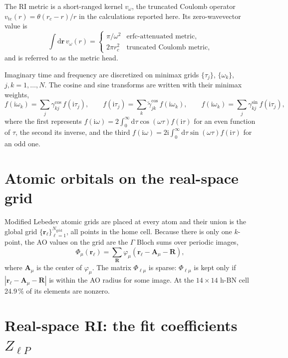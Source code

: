 \documentclass[11pt,a4paper]{article}
\newcommand{\br}{\mathbf{r}}
\newcommand{\bR}{\mathbf{R}}
\newcommand{\dd}{\mathrm{d}}
\newcommand{\ii}{\mathrm{i}}
\newcommand{\tc}{\mathrm{tc}}
\begin{document}
The RI metric is a short-ranged kernel $v_\omega$, the truncated Coulomb operator
$v_\tc(r) = \theta(r_c-r)/r$ in the calculations reported here. Its zero-wavevector value is
\begin{equation}
  \int\dd\br\, v_\omega(r) =
  \begin{cases}
    \pi/\omega^2 & \text{erfc-attenuated metric},\\
    2\pi r_c^2 & \text{truncated Coulomb metric},
  \end{cases}
  \label{eq:metric_head}
\end{equation}
and is referred to as the metric head.

Imaginary time and frequency are discretized on minimax grids $\{\tau_j\}$, $\{\omega_k\}$,
$j,k = 1,\dots,N$. The cosine and sine transforms are written with their minimax weights,
\begin{equation}
  f(\ii\omega_k) = \sum_j \gamma^{\cos}_{kj}\, f(\ii\tau_j),\qquad
  f(\ii\tau_j) = \sum_k \tilde\gamma^{\cos}_{jk}\, f(\ii\omega_k),\qquad
  f(\ii\omega_k) = \sum_j \gamma^{\sin}_{kj}\, f(\ii\tau_j),
  \label{eq:transforms}
\end{equation}
where the first represents $f(\ii\omega) = 2\int_0^\infty\dd\tau\cos(\omega\tau)f(\ii\tau)$ for
an even function of $\tau$, the second its inverse, and the third
$f(\ii\omega) = 2\ii\int_0^\infty\dd\tau\sin(\omega\tau)f(\ii\tau)$ for an odd one.

\section{Atomic orbitals on the real-space grid}

Modified Lebedev atomic grids are placed at every atom and their union is the global grid
$\{\br_\ell\}_{\ell=1}^{N_\mathrm{grid}}$, all points in the home cell. Because there is only one
$k$-point, the AO values on the grid are the $\Gamma$ Bloch sums over periodic images,
\begin{equation}
  \Phi_{\mu}(\br_\ell) = \sum_{\bR} \varphi_\mu(\br_\ell - \mathbf A_\mu - \bR),
  \label{eq:phi_grid}
\end{equation}
where $\mathbf A_\mu$ is the center of $\varphi_\mu$. The matrix $\Phi_{\ell\mu}$ is sparse:
$\Phi_{\ell\mu}$ is kept only if $|\br_\ell-\mathbf A_\mu-\bR|$ is within the AO radius for some
image. At the $14\times14$ h-BN cell 24.9\,\% of its elements are nonzero.

\section{Real-space RI: the fit coefficients $Z_{\ell P}$}
\end{document}
